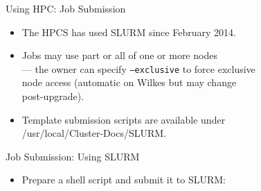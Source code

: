 \begin{frame}{Using HPC: Job Submission}
\begin{itemize}
\item{The HPCS has used SLURM since February 2014.}
\item{Jobs may use \alert{part} or \alert{all} of one or more nodes\hfill\\
\qquad --- the owner can specify \mbox{\tt --exclusive} to force exclusive\hfill\\\qquad\hphantom{---} node access (automatic on Wilkes \alert{but may change\hfill\\\qquad\hphantom{---} post-upgrade}).}
\item{Template submission scripts are available under\hfill\\
\qquad \alert{/usr/local/Cluster-Docs/SLURM}.}
\end{itemize}
\end{frame}

\begin{frame}[fragile]{Job Submission: Using SLURM}
\begin{itemize}
\item{Prepare a shell script and submit it to SLURM:}
\end{itemize}
\end{frame}


